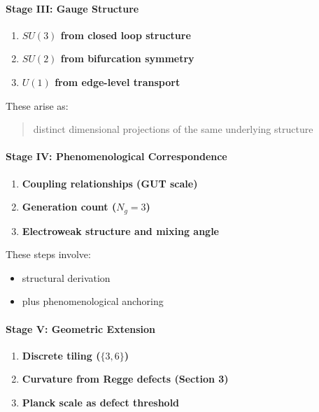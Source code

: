 \documentclass[
]{article}
\providecommand{\tightlist}{%
  \setlength{\itemsep}{0pt}\setlength{\parskip}{0pt}}
\begin{document}
\paragraph{Stage III: Gauge Structure}\label{stage-iii-gauge-structure}

\begin{enumerate}
\def\labelenumi{\arabic{enumi}.}
\setcounter{enumi}{7}
\tightlist
\item
  \textbf{\(SU(3)\) from closed loop structure}
\item
  \textbf{\(SU(2)\) from bifurcation symmetry}
\item
  \textbf{\(U(1)\) from edge-level transport}
\end{enumerate}

These arise as:

\begin{quote}
distinct dimensional projections of the same underlying structure
\end{quote}

\paragraph{Stage IV: Phenomenological
Correspondence}\label{stage-iv-phenomenological-correspondence}

\begin{enumerate}
\def\labelenumi{\arabic{enumi}.}
\setcounter{enumi}{10}
\tightlist
\item
  \textbf{Coupling relationships (GUT scale)}
\item
  \textbf{Generation count (\(N_g = 3\))}
\item
  \textbf{Electroweak structure and mixing angle}
\end{enumerate}

These steps involve:

\begin{itemize}
\tightlist
\item
  structural derivation
\item
  plus phenomenological anchoring
\end{itemize}

\paragraph{Stage V: Geometric
Extension}\label{stage-v-geometric-extension}

\begin{enumerate}
\def\labelenumi{\arabic{enumi}.}
\setcounter{enumi}{13}
\tightlist
\item
  \textbf{Discrete tiling (\(\{3,6\}\))}
\item
  \textbf{Curvature from Regge defects (Section 3)}
\item
  \textbf{Planck scale as defect threshold}
\end{enumerate}
\end{document}
